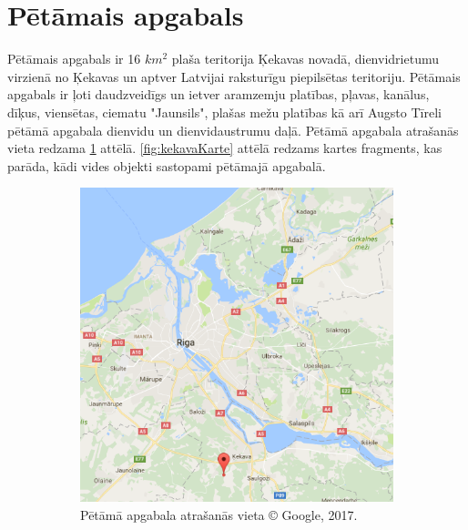 \documentclass[12pt,paper=a4]{report}
\begin{document}
\section{Pētāmais apgabals}
Pētāmais apgabals ir 16 $km^2$ plaša teritorija Ķekavas novadā, dienvidrietumu virzienā no Ķekavas un aptver Latvijai raksturīgu piepilsētas teritoriju. Pētāmais apgabals ir ļoti daudzveidīgs un ietver aramzemju platības, pļavas, kanālus, dīķus, viensētas, ciematu "Jaunsils", plašas mežu platības kā arī Augsto Tīreli pētāmā apgabala dienvidu un dienvidaustrumu daļā. Pētāmā apgabala atrašanās vieta redzama \ref{fig:lielaKarte} attēlā. \ref{fig:kekavaKarte} attēlā redzams kartes fragments, kas parāda, kādi vides objekti sastopami pētāmajā apgabalā.
\begin{figure}[h!]
\centering
\begin{subfigure}[b]{.49\linewidth}
\includegraphics[width=\linewidth]{karte}
\caption{Pētāmā apgabala atrašanās vieta © Google, 2017.}\label{fig:lielaKarte}
\end{subfigure}
\begin{subfigure}[b]{.49\linewidth}

\end{subfigure}
\end{figure}
\end{document}
